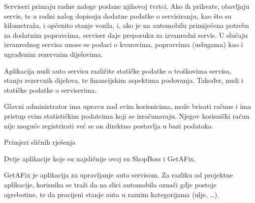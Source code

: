 		Serviseri primaju radne naloge poslane njihovoj tvrtci. Ako ih prihvate, obavljaju servis, te u radni nalog dopisuju dodatne podatke o servisiranju, kao što su kilometraža, i opčenito stanje vozila, i, ako je na automobilu primijećena potreba za dodatnim popravcima, serviser daje preporuku za izvanredni servis. U slučaju izvanrednog servisa unose se podaci o kvarovima, popravcima (uslugama) kao i ugrađenim rezervnim dijelovima.

		Aplikacija nudi auto servisu različite statičke podatke o troškovima servisa, stanju rezervnih dijelova, te financijskim aspektima poslovanja. Također, nudi i statičke podatke o serviserima.
		
		Glavni administrator ima upravu nad svim korisnicima, može brisati račune i ima pristup svim statističkim podatcima koji se izračunavaju. Njegov korisnički račun nije moguće registrirati već se on direktno postavlja u bazi podataka.
		
		
		\newpage
		\Large Primjeri sličnih rješenja
		
		\normalsize Dvije aplikacije koje su najsličnije ovoj su ShopBoss i GetAFix. 
		
		GetAFix je aplikacija za upravljanje auto servisom. Za razliku od projektne aplikacije, korisnika se traži da na slici automobila označi gdje postoje ogrebotine, te da procijeni stanje auta u raznim kategorijama (ulje, \ldots).
		
